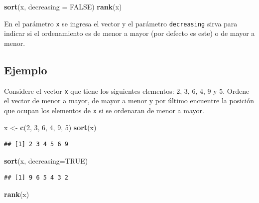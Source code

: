 \documentclass[10pt,]{krantz}
\makeatletter
\newenvironment{Shaded}{\begin{snugshade}}{\end{snugshade}}
\newcommand{\KeywordTok}[1]{\textcolor[rgb]{0.13,0.29,0.53}{\textbf{{#1}}}}
\newcommand{\DataTypeTok}[1]{\textcolor[rgb]{0.13,0.29,0.53}{{#1}}}
\newcommand{\DecValTok}[1]{\textcolor[rgb]{0.00,0.00,0.81}{{#1}}}
\newcommand{\StringTok}[1]{\textcolor[rgb]{0.31,0.60,0.02}{{#1}}}
\newcommand{\OtherTok}[1]{\textcolor[rgb]{0.56,0.35,0.01}{{#1}}}
\newcommand{\NormalTok}[1]{{#1}}
\newenvironment{kframe}{%
\medskip{}
\setlength{\fboxsep}{.8em}
 \def\at@end@of@kframe{}%
 \ifinner\ifhmode%
  \def\at@end@of@kframe{\end{minipage}}%
  \begin{minipage}{\columnwidth}%
 \fi\fi%
 \def\FrameCommand##1{\hskip\@totalleftmargin \hskip-\fboxsep
 \colorbox{shadecolor}{##1}\hskip-\fboxsep
     \hskip-\linewidth \hskip-\@totalleftmargin \hskip\columnwidth}%
 \MakeFramed {\advance\hsize-\width
   \@totalleftmargin\z@ \linewidth\hsize
   \@setminipage}}%
 {\par\unskip\endMakeFramed%
 \at@end@of@kframe}
\renewenvironment{Shaded}{\begin{kframe}}{\end{kframe}}
\makeatother
\begin{document}
\begin{Shaded}
\begin{Highlighting}[]
\KeywordTok{sort}\NormalTok{(x, }\DataTypeTok{decreasing =} \OtherTok{FALSE}\NormalTok{)}
\KeywordTok{rank}\NormalTok{(x)}
\end{Highlighting}
\end{Shaded}

En el parámetro \texttt{x} se ingresa el vector y el parámetro
\texttt{decreasing} sirva para indicar si el ordenamiento es de menor a
mayor (por defecto es este) o de mayor a menor.

\subsection*{Ejemplo}\label{ejemplo-7}


Considere el vector \texttt{x} que tiene los siguientes elementos: 2, 3,
6, 4, 9 y 5. Ordene el vector de menor a mayor, de mayor a menor y por
último encuentre la posición que ocupan los elementos de \texttt{x} si
se ordenaran de menor a mayor.

\begin{Shaded}
\begin{Highlighting}[]
\NormalTok{x <-}\StringTok{ }\KeywordTok{c}\NormalTok{(}\DecValTok{2}\NormalTok{, }\DecValTok{3}\NormalTok{, }\DecValTok{6}\NormalTok{, }\DecValTok{4}\NormalTok{, }\DecValTok{9}\NormalTok{, }\DecValTok{5}\NormalTok{)}
\KeywordTok{sort}\NormalTok{(x)}
\end{Highlighting}
\end{Shaded}

\begin{verbatim}
## [1] 2 3 4 5 6 9
\end{verbatim}

\begin{Shaded}
\begin{Highlighting}[]
\KeywordTok{sort}\NormalTok{(x, }\DataTypeTok{decreasing=}\OtherTok{TRUE}\NormalTok{)}
\end{Highlighting}
\end{Shaded}

\begin{verbatim}
## [1] 9 6 5 4 3 2
\end{verbatim}

\begin{Shaded}
\begin{Highlighting}[]
\KeywordTok{rank}\NormalTok{(x)}
\end{Highlighting}
\end{Shaded}
\end{document}
